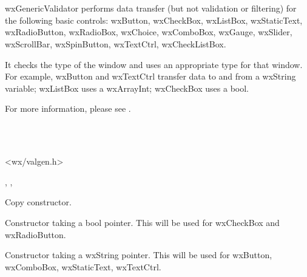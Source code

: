 \section{}\label{wxgenericvalidator}

wxGenericValidator performs data transfer (but not validation or filtering) for the following
basic controls: wxButton, wxCheckBox, wxListBox, wxStaticText, wxRadioButton, wxRadioBox,
wxChoice, wxComboBox, wxGauge, wxSlider, wxScrollBar, wxSpinButton, wxTextCtrl, wxCheckListBox.

It checks the type of the window and uses an appropriate type for that window. For example,
wxButton and wxTextCtrl transfer data to and from a wxString variable; wxListBox uses a
wxArrayInt; wxCheckBox uses a bool.

For more information, please see .


\\
\\


<wx/valgen.h>




, ,


\label{wxgenericvalidatorctor}


Copy constructor.


Constructor taking a bool pointer. This will be used for wxCheckBox and wxRadioButton.


Constructor taking a wxString pointer. This will be used for wxButton, wxComboBox, wxStaticText,
wxTextCtrl.

